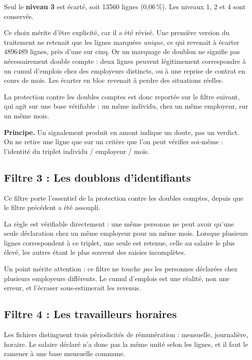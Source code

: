 \documentclass[11pt,a4paper]{article}
\begin{document}
Seul le \textbf{niveau 3} est écarté, soit \num{13560} lignes (0,06\,\%).
Les niveaux 1, 2 et 4 sont conservés.

Ce choix mérite d'être explicité, car il a été révisé. Une première
version du traitement ne retenait que les lignes marquées \emph{unique},
ce qui revenait à écarter \num{4896489} lignes, près d'une sur cinq. Or
un marquage de doublon ne signifie pas nécessairement double compte : deux
lignes peuvent légitimement correspondre à un cumul d'emplois chez des
employeurs distincts, ou à une reprise de contrat en cours de mois. Les
écarter en bloc revenait à perdre des situations réelles.

La protection contre les doubles comptes est donc reportée sur le filtre
suivant, qui agit sur une base vérifiable : un même individu, chez un même
employeur, sur un même mois.

\begin{retenir}
\textbf{Principe.} Un signalement produit en amont indique un doute, pas
un verdict. On ne retire une ligne que sur un critère que l'on peut
vérifier soi-même : l'identité du triplet individu / employeur /
mois.
\end{retenir}

\subsection{Filtre 3 : Les doublons d'identifiants}

Ce filtre porte l'essentiel de la protection contre les doubles comptes,
depuis que le filtre précédent a été assoupli.

La règle est vérifiable directement : une même personne ne peut avoir
qu'une seule déclaration chez un même employeur pour un même mois. Lorsque
plusieurs lignes correspondent à ce triplet, une seule est retenue, celle
au salaire le plus élevé, les autres étant le plus souvent des saisies
incomplètes.

Un point mérite attention : ce filtre ne touche \emph{pas} les personnes
déclarées chez plusieurs employeurs différents. Le cumul d'emplois est une
réalité, non une erreur, et l'écraser sous-estimerait les revenus.

\subsection{Filtre 4 : Les travailleurs horaires}

Les fichiers distinguent trois périodicités de rémunération : mensuelle,
journalière, horaire. Le salaire déclaré n'a donc pas la même unité selon
les lignes, et il faut le ramener à une base mensuelle commune.
\end{document}
